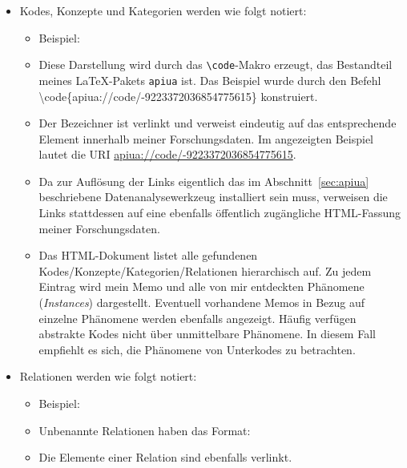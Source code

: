 \documentclass[11pt,a4paper]{book}
\newcommand{\sref}[1]{Abschnitt~\ref{#1}}
\begin{document}
\begin{itemize}\raggedright
  \item Kodes, Konzepte und Kategorien werden wie folgt notiert: 
  \begin{itemize}
    \item Beispiel: 
    \item Diese Darstellung wird durch das \texttt{\textbackslash{}code}-Makro erzeugt, das Bestandteil meines \LaTeX-Pakets \texttt{apiua} ist. Das Beispiel wurde durch den Befehl \textbackslash{}code\{apiua://code/-9223372036854775615\} konstruiert.  
    \item Der Bezeichner ist verlinkt und verweist eindeutig auf das entsprechende Element innerhalb meiner Forschungsdaten. Im angezeigten Beispiel lautet die URI \url{apiua://code/-9223372036854775615}.
    \item Da zur Auflösung der Links eigentlich das im \sref{sec:apiua} beschriebene Datenanalysewerkzeug installiert sein muss, verweisen die Links stattdessen auf eine ebenfalls öffentlich zugängliche HTML-Fassung meiner Forschungsdaten.
    \item Das HTML-Dokument listet alle gefundenen Kodes/Konzepte/Kategorien/Relationen hierarchisch auf. Zu jedem Eintrag wird mein Memo und alle von mir entdeckten Phänomene (\textit{Instances}) dargestellt. Eventuell vorhandene Memos in Bezug auf einzelne Phänomene werden ebenfalls angezeigt. Häufig verfügen abstrakte Kodes nicht über unmittelbare Phänomene. In diesem Fall empfiehlt es sich, die Phänomene von Unterkodes zu betrachten.
  \end{itemize}
  
  \item Relationen werden wie folgt notiert: 
  \begin{itemize}
    \item Beispiel: \mbox{}
    \item Unbenannte Relationen haben das Format: \mbox{}
    \item Die Elemente einer Relation sind ebenfalls verlinkt.
  \end{itemize}
  

\end{itemize}
\end{document}

